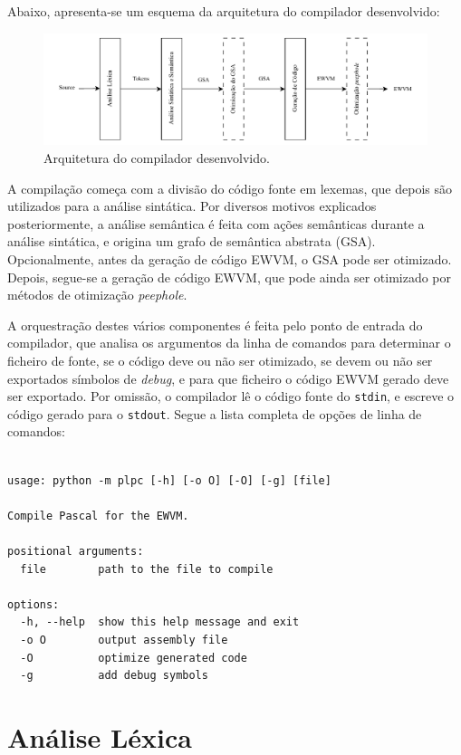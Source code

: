 \documentclass[12pt, a4paper]{article}
\begin{document}
Abaixo, apresenta-se um esquema da arquitetura do compilador desenvolvido:

\begin{figure}[H]
    \centering
    \includegraphics[width=\textwidth]{res/architecture.pdf}
    \caption{Arquitetura do compilador desenvolvido.}
\end{figure}

A compilação começa com a divisão do código fonte em lexemas, que depois são utilizados para a
análise sintática. Por diversos motivos explicados posteriormente, a análise semântica é feita com
ações semânticas durante a análise sintática, e origina um grafo de semântica abstrata (GSA).
Opcionalmente, antes da geração de código EWVM, o GSA pode ser otimizado. Depois, segue-se a geração
de código EWVM, que pode ainda ser otimizado por métodos de otimização \emph{peephole}.

A orquestração destes vários componentes é feita pelo ponto de entrada do compilador, que analisa
os argumentos da linha de comandos para determinar o ficheiro de fonte, se o código deve ou não ser
otimizado, se devem ou não ser exportados símbolos de \emph{debug}, e para que ficheiro o código
EWVM gerado deve ser exportado. Por omissão, o compilador lê o código fonte do \texttt{stdin}, e
escreve o código gerado para o \texttt{stdout}. Segue a lista completa de opções de linha de
comandos:


\begin{lstlisting}

usage: python -m plpc [-h] [-o O] [-O] [-g] [file]

Compile Pascal for the EWVM.

positional arguments:
  file        path to the file to compile

options:
  -h, --help  show this help message and exit
  -o O        output assembly file
  -O          optimize generated code
  -g          add debug symbols
\end{lstlisting}

\section{Análise Léxica}
\end{document}

